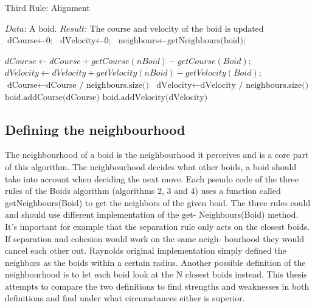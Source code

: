 \documentclass{article}
\begin{document}
\begin{algorithm}
\caption{Third Rule: Alignment}\label{euclid}
\begin{algorithmic}[1]
\State $\textit{Data:   } \text{A boid.}$
\State $\textit{Result:   } \text{The course and velocity of the boid is updated}$
\\
\State $\text{dCourse} \gets \text{0;}$
\State $\text{dVelocity} \gets \text{0;}$
\State $\text{neighbours} \gets \text{getNeighbours(boid);}$

    \State $ dCourse \gets dCourse + getCourse(nBoid) - getCourse(Boid);$
    \State $ dVelocity \gets dVelocity + getVelocity(nBoid) - getVelocity(Boid);$
\Endfor
\State $\text{dCourse} \gets \text{dCourse / neighbours.size()}$
\State $\text{dVelocity} \gets \text{dVelocity / neighbours.size()}$
\State $\text{boid.addCourse(dCourse)}$
\State $\text{boid.addVelocity(dVelocity)}$
\end{algorithmic}

\end{algorithm}

\pagebreak
\subsection{Defining the neighbourhood}
The neighbourhood of a boid is the neighbourhood it perceives and is a core part of this algorithm. The neighbourhood decides what other boids, a boid should take into account when deciding the next move.
Each pseudo code of the three rules of the Boids algorithm (algorithms 2, 3
and 4) uses a function called getNeighbours(Boid) to get the neighbors of the given
boid. The three rules could and should use different implementation of the get-
Neighbours(Boid) method. It’s important for example that the separation rule only
acts on the closest boids. If separation and cohesion would work on the same neigh-
bourhood they would cancel each other out.
Raynolds original implementation simply defined the neighbors as the boids
within a certain radius. Another possible definition of the neighbourhood is to let
each boid look at the N closest boids instead. This thesis attempts to compare the
two definitions to find strengths and weaknesses in both definitions and find under
what circumstances either is superior.\\
\end{document}
